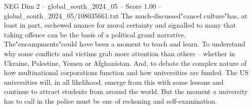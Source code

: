 \begin{textsample}{NEG Dim 2 – global\_south\_2024\_05 – Score 1.00 – global\_south\_2024\_05/108035661.txt}
The much-discussed"cancel culture"has, at least in part, eschewed nuance for moral certainty and signalled to many that taking offence can be the basis of a political grand narrative.
The"encampments"could have been a moment to teach and learn.
To understand why some conflicts and victims grab more attention than others -- whether in Ukraine, Palestine, Yemen or Afghanistan.
And, to debate the complex nature of how multinational corporations function and how universities are funded.
The US universities will, in all likelihood, emerge from this with some lessons and continue to attract students from around the world.
But the moment a university has to call in the police must be one of reckoning and self-examination.

\end{textsample}

